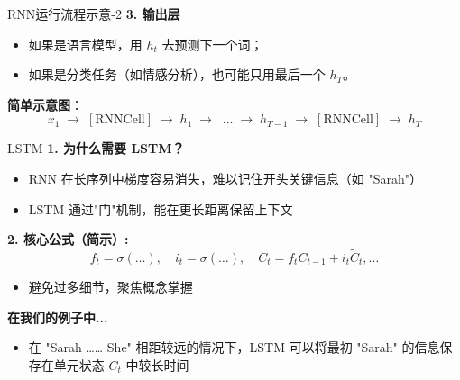 \documentclass{beamer}
\begin{document}
  \begin{frame}{RNN运行流程示意-2}
  \textbf{3. 输出层}
  \begin{itemize}
    \item 如果是语言模型，用 \(h_t\) 去预测下一个词；
    \item 如果是分类任务（如情感分析），也可能只用最后一个 \(h_T\)。
  \end{itemize}
  
  \textbf{简单示意图}：
  \[
    x_1 \;\to\;[\mathrm{RNNCell}]\;\to\;h_1 
    \;\to\;\;\ldots\;\to\;h_{T-1} 
    \;\to\;[\mathrm{RNNCell}]\;\to\;h_T
  \]
\end{frame}

\begin{frame}{LSTM}
  \textbf{1. 为什么需要 LSTM？}
  \begin{itemize}
    \item RNN 在长序列中梯度容易消失，难以记住开头关键信息（如 "Sarah"）
    \item LSTM 通过"门"机制，能在更长距离保留上下文
  \end{itemize}

  \textbf{2. 核心公式（简示）:}
  \[
    f_t = \sigma(\dots), \quad
    i_t = \sigma(\dots), \quad
    C_t = f_t C_{t-1} + i_t \tilde{C}_t, \dots
  \]
  \begin{itemize}
    \item 避免过多细节，聚焦概念掌握
  \end{itemize}

  \textbf{在我们的例子中...}
  \begin{itemize}
    \item 在 "Sarah …… She" 相距较远的情况下，LSTM 可以将最初 "Sarah" 的信息保存在单元状态 $C_t$ 中较长时间
  \end{itemize}
\end{frame}
\end{document}
